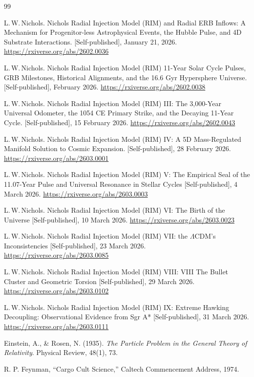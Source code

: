 \documentclass[12pt]{article}
\begin{document}
\begin{thebibliography}{99}

L.\,W.\,Nichols.
Nichols Radial Injection Model (RIM) and Radial ERB Inflows: A Mechanism for Progenitor-less Astrophysical Events, the Hubble Pulse, and 4D Substrate Interactions.
[Self-published], January 21, 2026.
\newline
\url{https://rxiverse.org/abs/2602.0036}

L.\,W.\,Nichols.
Nichols Radial Injection Model (RIM) 11-Year Solar Cycle Pulses, GRB Milestones, Historical Alignments, and the 16.6 Gyr Hypersphere Universe.
[Self-published], February 2026.
\newline
\url{https://rxiverse.org/abs/2602.0038}

L.\,W.\,Nichols.
Nichols Radial Injection Model (RIM) III: The 3,000-Year Universal Odometer, the 1054 CE Primary Strike, and the Decaying 11-Year Cycle.
[Self-published], 15 February 2026.
\newline
\url{https://rxiverse.org/abs/2602.0043}

L.\,W.\,Nichols.
Nichols Radial Injection Model (RIM) IV: A 5D Mass-Regulated Manifold Solution to Cosmic Expansion.
[Self-published], 28 February 2026.
\newline
\url{https://rxiverse.org/abs/2603.0001}

L.\,W.\,Nichols.
Nichols Radial Injection Model (RIM) V:
The Empirical Seal of the 11.07-Year Pulse
and Universal Resonance in Stellar Cycles
[Self-published], 4 March 2026.
\newline
\url{https://rxiverse.org/abs/2603.0003}

L.\,W.\,Nichols.
Nichols Radial Injection Model (RIM) VI:
The Birth of the Universe
[Self-published], 10 March 2026.
\newline
\url{https://rxiverse.org/abs/2603.0023}

L.\,W.\,Nichols.
Nichols Radial Injection Model (RIM) VII:
the $\Lambda$CDM’s Inconsistencies
[Self-published], 23 March 2026.
\newline
\url{https://rxiverse.org/abs/2603.0085}

L.\,W.\,Nichols.
Nichols Radial Injection Model (RIM) VIII:
VIII The Bullet Cluster and Geometric Torsion
[Self-published], 29 March 2026.
\newline
\url{https://rxiverse.org/abs/2603.0102}

L.\,W.\,Nichols.
Nichols Radial Injection Model (RIM) IX:
Extreme Hawking Decoupling: Observational Evidence from Sgr A*
[Self-published], 31 March 2026.
\newline
\url{https://rxiverse.org/abs/2603.0111}

Einstein, A., \& Rosen, N. (1935).
\textit{The Particle Problem in the General Theory of Relativity}.
Physical Review, 48(1), 73.

 R. P. Feynman, ``Cargo Cult Science,'' Caltech Commencement Address, 1974.
\end{thebibliography}
\end{document}
